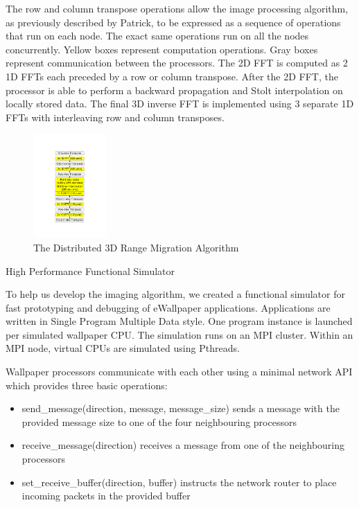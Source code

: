 \documentclass[twocolumn]{article}
\makeatletter
\def\section{\@startsection{section}{1}{\z@}{24pt plus 2 pt
minus 2 pt} {12pt plus 2pt minus 2pt}{\large\bf}}
\makeatother
\begin{document}
The row and column transpose operations allow the image processing algorithm, as previously described by Patrick, to be expressed as a sequence of operations that run on each node.
The exact same operations run on all the nodes concurrently.
Yellow boxes represent computation operations.
Gray boxes represent communication between the processors.
The 2D FFT is computed as 2 1D FFTs each preceded by a row or column transpose. 
After the 2D FFT, the processor is able to perform a backward propagation and Stolt interpolation on locally stored data.
The final 3D inverse FFT is implemented using 3 separate 1D FFTs with interleaving row and column transposes.

\begin{figure}[!h]
\centering
\includegraphics*[width=0.25\textwidth, viewport=170 125 420 700]{figures/algorithm.pdf}
\caption{The Distributed 3D Range Migration Algorithm}
\label{algorithm}
\end{figure}

\section{High Performance Functional Simulator}

To help us develop the imaging algorithm, we created a functional simulator for fast prototyping and debugging of eWallpaper applications. Applications are written in Single Program Multiple Data style. One program instance is launched per simulated wallpaper CPU. The simulation runs on an MPI cluster. Within an MPI node, virtual CPUs are simulated using Pthreads.

Wallpaper processors communicate with each other using a minimal network API which provides three basic operations:
\begin{itemize}
\item send\_message(direction, message, message\_size) sends a message with the provided message size to one of the four neighbouring processors
\item receive\_message(direction) receives a message from one of the neighbouring processors
\item set\_receive\_buffer(direction, buffer) instructs the network router to place incoming packets in the provided buffer
\end{itemize}
\end{document}
